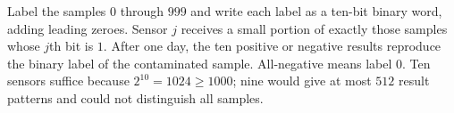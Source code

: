 Label the samples $0$ through $999$ and write each label as a ten-bit binary word, adding leading zeroes. Sensor $j$ receives a small portion of exactly those samples whose $j$th bit is $1$. After one day, the ten positive or negative results reproduce the binary label of the contaminated sample. All-negative means label $0$. Ten sensors suffice because $2^{10}=1024\ge1000$; nine would give at most $512$ result patterns and could not distinguish all samples.
